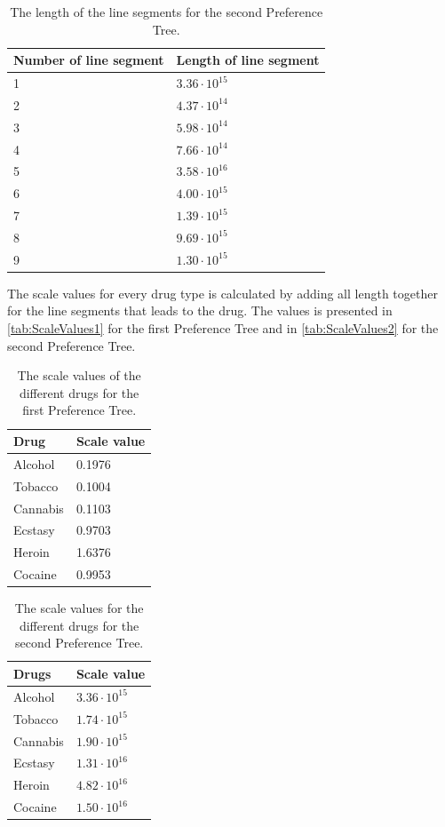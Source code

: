 \noindent 
% 
\begin{table}[H]
	\centering
	\begin{tabular}{@{}ll@{}}
		\toprule
		Number of line segment  & Length of line segment \\ \midrule
		1						& $3.36\cdot10^{15}$   \\
		2      					& $4.37\cdot10^{14}$   \\
		3      					& $5.98\cdot10^{14}$   \\
		4      					& $7.66\cdot10^{14}$   \\
		5      					& $3.58\cdot10^{16}$   \\
		6     					& $4.00\cdot10^{15}$   \\
		7      					& $1.39\cdot10^{15}$   \\
		8						& $9.69\cdot10^{15}$   \\
		9						& $1.30\cdot10^{15}$   \\ \bottomrule
	\end{tabular}
	\caption{The length of the line segments for the second Preference Tree.}
	\label{tab:Length2}
\end{table} 
\noindent 
%
The scale values for every drug type is calculated by adding all length together for the line segments that leads to the drug. The values is presented in \autoref{tab:ScaleValues1} for the first Preference Tree and in \autoref{tab:ScaleValues2} for the second Preference Tree.\blankline
% 
\begin{table}[H]
	\centering
	\begin{tabular}{@{}ll@{}}
		\toprule
		Drug      & Scale value \\ \midrule
		Alcohol	  & 0.1976   \\
		Tobacco	  & 0.1004   \\
		Cannabis  & 0.1103   \\
		Ecstasy	  & 0.9703   \\
		Heroin	  & 1.6376   \\
		Cocaine	  & 0.9953   \\	\bottomrule
	\end{tabular}
	\caption{The scale values of the different drugs for the first Preference Tree.}
	\label{tab:ScaleValues1}
\end{table} 
\noindent 
%
\begin{table}[H]
	\centering
	\begin{tabular}{@{}ll@{}}
		\toprule
		Drugs     & Scale value \\ \midrule
		Alcohol	  & $3.36\cdot10^{15}$   \\
		Tobacco	  & $1.74\cdot10^{15}$   \\
		Cannabis  & $1.90\cdot10^{15}$   \\
		Ecstasy	  & $1.31\cdot10^{16}$   \\
		Heroin	  & $4.82\cdot10^{16}$   \\
		Cocaine	  & $1.50\cdot10^{16}$   \\	\bottomrule
	\end{tabular}
	\caption{The scale values for the different drugs for the second Preference Tree.}
	\label{tab:ScaleValues2}
\end{table} 
